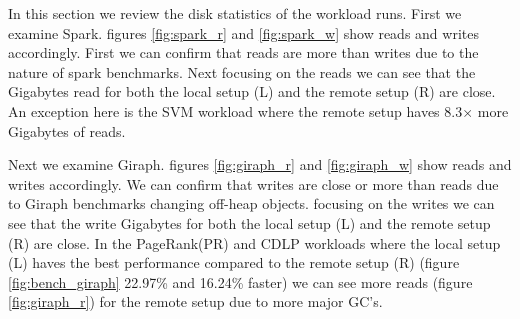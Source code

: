 {\par In this section we review the disk statistics of the workload runs. First we examine Spark. figures \ref{fig:spark_r} and \ref{fig:spark_w} show reads and writes accordingly. First we can confirm that reads are more than writes due to the nature of spark benchmarks. Next focusing on the reads we can see that the Gigabytes read for both the local setup (L) and the remote setup (R) are close. An exception here is the SVM workload where the remote setup haves 8.3× more Gigabytes of reads.
\par Next we examine Giraph. figures \ref{fig:giraph_r} and \ref{fig:giraph_w} show reads and writes accordingly. We can confirm that writes are close or more than reads due to Giraph benchmarks changing off-heap objects. focusing on the writes we can see that the write Gigabytes for both the local setup (L) and the remote setup (R) are close. In the PageRank(PR)	and CDLP workloads where the local setup (L) haves the best performance compared to the remote setup (R) (figure \ref{fig:bench_giraph} 22.97\% and 16.24\% faster) we can see more reads (figure \ref{fig:giraph_r}) for the remote setup due to more major GC's.

}
